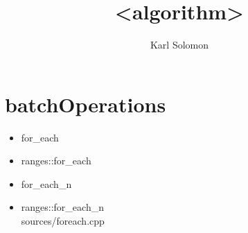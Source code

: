 \documentclass{article}
\begin{document}
\selectfont
\title{<algorithm>}
\author{Karl Solomon}
\maketitle
\tableofcontents
\newpage

\section{batchOperations}
    \begin{itemize}
      \item for\_each
      \item ranges::for\_each
      \item for\_each\_n
      \item ranges::for\_each\_n \\
         {sources/foreach.cpp}
    \end{itemize}
\end{document}
